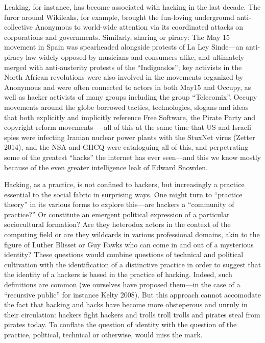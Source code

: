 \documentclass[10pt,letter,oneside]{scrartcl}
\begin{document}
Leaking, for instance, has become associated with hacking in the last decade.
The furor around Wikileaks, for example, brought the fun-loving underground
anti-collective Anonymous to world-wide attention via its coordinated attacks
on corporations and governments.  Similarly, sharing or piracy: The May 15
movement in Spain was spearheaded alongside protests of La Ley Sinde---an
anti-piracy law widely opposed by musicians and consumers alike, and ultimately
merged with anti-austerity protests of the ``Indignados''; key activists in the
North African revolutions were also involved in the movements organized by
Anonymous and were often connected to actors in both May15 and Occupy, as well
as hacker activists of many groups including the group ``Telecomix''.  Occupy
movements around the globe borrowed tactics, technologies, slogans and ideas
that both explicitly and implicitly reference Free Software, the Pirate Party
and copyright reform movements—--all of this at the same time that US and
Israeli spies were infecting Iranian nuclear power plants with the StuxNet
virus (Zetter 2014), and the NSA and GHCQ were cataloguing all of this, and
perpetrating some of the greatest ``hacks'' the internet has ever seen---and
this we know mostly because of the even greater intelligence leak of Edward
Snowden.

Hacking, as a practice, is not confined to hackers, but increasingly a practice
essential to the social fabric in surprising ways.  One might turn to
``practice theory'' in its various forms to explore this---are hackers a
``community of practice?'' Or constitute an emergent political expression of a
particular sociocultural formation? Are they heterodox actors in the context of
the computing field or are they wildcards in various professional domains, akin
to the figure of Luther Blisset or Guy Fawks who can come in and out of a
mysterious identity?  These questions would combine questions of technical and
political cultivation with the identification of a distinctive practice in
order to suggest that the identity of a hackers is based in the practice of
hacking.  Indeed, such definitions are common (we ourselves have proposed
them---in the case of a ``recursive public'' for instance Kelty 2008).  But
this approach cannot accomodate the fact that hacking and hacks have become
more obsteperous and unruly in their circulation: hackers fight hackers and
trolls troll trolls and pirates steal from pirates today.  To conflate the
question of identity with the question of the practice, political, technical or
otherwise, would miss the mark.
\end{document}
